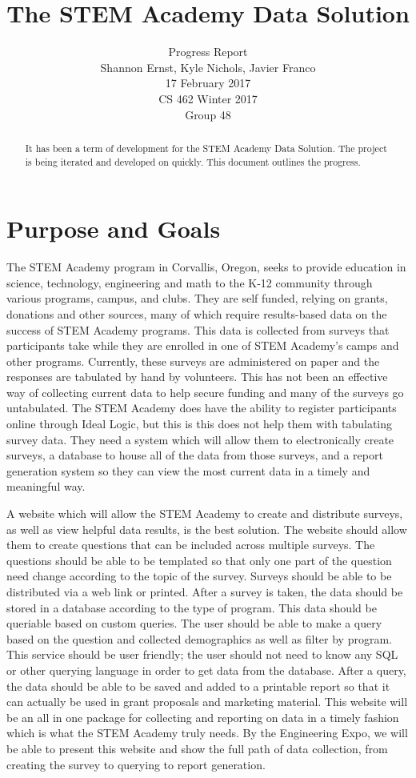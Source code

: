 \documentclass[letterpaper,10pt,serif, draftclsnofoot,onecolumn, compsoc, titlepage]{IEEEtran}
\title{The STEM Academy Data Solution}
\author{Progress Report \\ Shannon Ernst, Kyle Nichols, Javier Franco\\ 17 February 2017\\ CS 462 Winter 2017\\ Group 48}
\begin{document}
\maketitle
\begin{abstract}
It has been a term of development for the STEM Academy Data Solution. The project is being iterated and developed on quickly. This document outlines the progress.
\end{abstract}
\newpage
\section{Purpose and Goals}
The STEM Academy program in Corvallis, Oregon, seeks to provide education in science, technology, engineering and math to the K-12 community through various programs, campus, and clubs.
They are self funded, relying on grants, donations and other sources, many of which require results-based data on the success of STEM Academy programs.
This data is collected from surveys that participants take while they are enrolled in one of STEM Academy's camps and other programs.
Currently, these surveys are administered on paper and the responses are tabulated by hand by volunteers.
This has not been an effective way of collecting current data to help secure funding and many of the surveys go untabulated.
The STEM Academy does have the ability to register participants online through Ideal Logic, but this is this does not help them with tabulating survey data.
They need a system which will allow them to electronically create surveys, a database to house all of the data from those surveys, and a report generation system so they can view the most current data in a timely and meaningful way.

A website which will allow the STEM Academy to create and distribute surveys, as well as view helpful data results, is the best solution.
The website should allow them to create questions that can be included across multiple surveys.
The questions should be able to be templated so that only one part of the question need change according to the topic of the survey.
Surveys should be able to be distributed via a web link or printed.
After a survey is taken, the data should be stored in a database according to the type of program.
This data should be queriable based on custom queries.
The user should be able to make a query based on the question and collected demographics as well as filter by program.
This service should be user friendly; the user should not need to know any SQL or other querying language in order to get data from the database.
After a query, the data should be able to be saved and added to a printable report so that it can actually be used in grant proposals and marketing material.
This website will be an all in one package for collecting and reporting on data in a timely fashion which is what the STEM Academy truly needs.
By the Engineering Expo, we will be able to present this website and show the full path of data collection, from creating the survey to querying to report generation.
\end{document}

